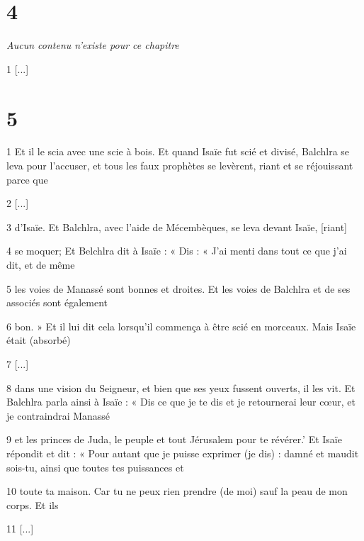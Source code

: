\chapter{4}

\par \textit{Aucun contenu n'existe pour ce chapitre}

\par 1 [...]

\chapter{5}

\par 1 Et il le scia avec une scie à bois. Et quand Isaïe fut scié et divisé, Balchlra se leva pour l'accuser, et tous les faux prophètes se levèrent, riant et se réjouissant parce que

\par 2 [...]

\par 3 d’Isaïe. Et Balchlra, avec l'aide de Mécembèques, se leva devant Isaïe, [riant]

\par 4 se moquer; Et Belchlra dit à Isaïe : « Dis : « J'ai menti dans tout ce que j'ai dit, et de même

\par 5 les voies de Manassé sont bonnes et droites. Et les voies de Balchlra et de ses associés sont également

\par 6 bon. » Et il lui dit cela lorsqu'il commença à être scié en morceaux. Mais Isaïe était (absorbé)

\par 7 [...]

\par 8 dans une vision du Seigneur, et bien que ses yeux fussent ouverts, il les vit. Et Balchlra parla ainsi à Isaïe : « Dis ce que je te dis et je retournerai leur cœur, et je contraindrai Manassé

\par 9 et les princes de Juda, le peuple et tout Jérusalem pour te révérer.' Et Isaïe répondit et dit : « Pour autant que je puisse exprimer (je dis) : damné et maudit sois-tu, ainsi que toutes tes puissances et

\par 10 toute ta maison. Car tu ne peux rien prendre (de moi) sauf la peau de mon corps. Et ils

\par 11 [...]

